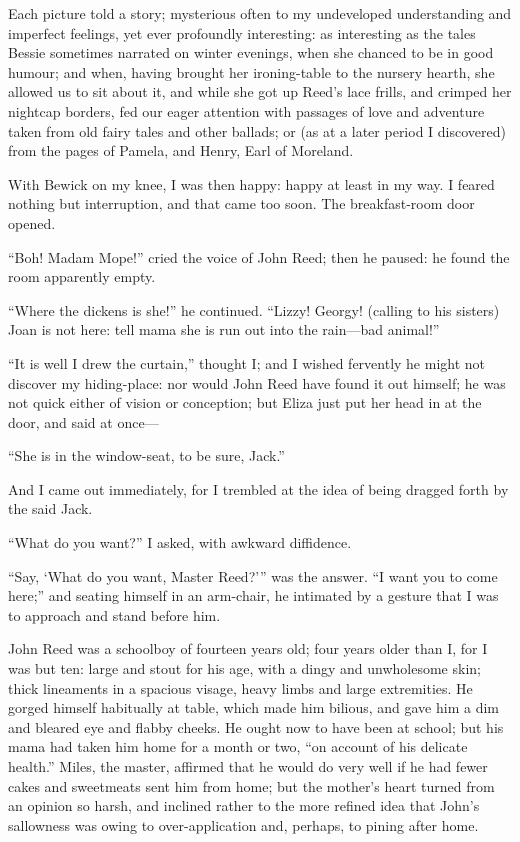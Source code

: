 Each picture told a story; mysterious often to my undeveloped
understanding and imperfect feelings, yet ever profoundly interesting:
as interesting as the tales Bessie sometimes narrated on winter
evenings, when she chanced to be in good humour; and when, having
brought her ironing-table to the nursery hearth, she allowed us to sit
about it, and while she got up \Mrs{} Reed's lace frills, and crimped her
nightcap borders, fed our eager attention with passages of love and
adventure taken from old fairy tales and other ballads; or (as at a
later period I discovered) from the pages of Pamela, and Henry, Earl of
Moreland.

With Bewick on my knee, I was then happy: happy at least in my way. I
feared nothing but interruption, and that came too soon. The
breakfast-room door opened.

\enquote{Boh! Madam Mope!} cried the voice of John Reed; then he
paused: he found the room apparently empty.

\enquote{Where the dickens is she!} he continued. \enquote{Lizzy!
	Georgy! (calling to his sisters) Joan is not here: tell mama she is run
	out into the rain---bad animal!}

\enquote{It is well I drew the curtain,} thought I; and I wished
fervently he might not discover my hiding-place: nor would John Reed
have found it out himself; he was not quick either of vision or
conception; but Eliza just put her head in at the door, and said at
once---

\enquote{She is in the window-seat, to be sure, Jack.}

And I came out immediately, for I trembled at the idea of being dragged
forth by the said Jack.

\enquote{What do you want?} I asked, with awkward diffidence.

\enquote{Say, \enquote{What do you want, Master Reed?}} was the
answer. \enquote{I want you to come here;} and seating himself in an
arm-chair, he intimated by a gesture that I was to approach and stand
before him.

John Reed was a schoolboy of fourteen years old; four years older than
I, for I was but ten: large and stout for his age, with a dingy and
unwholesome skin; thick lineaments in a spacious visage, heavy limbs and
large extremities. He gorged himself habitually at table, which made
him bilious, and gave him a dim and bleared eye and flabby cheeks. He
ought now to have been at school; but his mama had taken him home for a
month or two, \enquote{on account of his delicate health.} \Mr{} Miles,
the master, affirmed that he would do very well if he had fewer cakes
and sweetmeats sent him from home; but the mother's heart turned from an
opinion so harsh, and inclined rather to the more refined idea that
John's sallowness was owing to over-application and, perhaps, to pining
after home.

